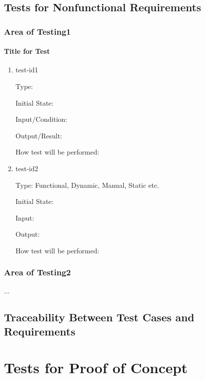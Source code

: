 \documentclass[11pt]{article}
\begin{document}
\subsection{Tests for Nonfunctional Requirements}

\subsubsection{Area of Testing1}
		
\paragraph{Title for Test}

\begin{enumerate}

\item{test-id1\\}

Type: 
					
Initial State: 
					
Input/Condition: 
					
Output/Result: 
					
How test will be performed: 
					
\item{test-id2\\}

Type: Functional, Dynamic, Manual, Static etc.
					
Initial State: 
					
Input: 
					
Output: 
					
How test will be performed: 

\end{enumerate}

\subsubsection{Area of Testing2}

...

\subsection{Traceability Between Test Cases and Requirements}

\section{Tests for Proof of Concept}
\end{document}
